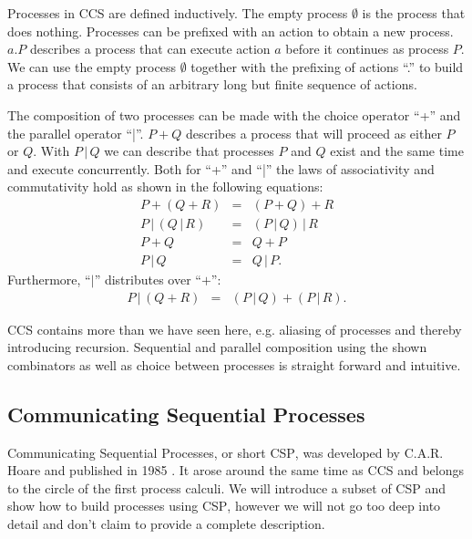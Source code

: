 Processes in \textsc{CCS} are defined inductively. The empty process $\emptyset$ is the process that does nothing. Processes can be prefixed with an action to obtain a new process. $a.P$ describes a process that can execute action $a$ before it continues as process $P$. We can use the empty process $\emptyset$ together with the prefixing of actions \enquote{.} to build a process that consists of an arbitrary long but finite sequence of actions.

The composition of two processes can be made with the choice operator \enquote{+} and the parallel operator \enquote{|}. $P + Q$ describes a process that will proceed as either $P$ or $Q$. With $P \,|\, Q$ we can describe that processes $P$ and $Q$ exist and the same time and execute concurrently. Both for \enquote{+} and \enquote{|} the laws of associativity and commutativity hold as shown in the following equations:
\begin{eqnarray*}
  P + \left( Q + R \right) & = & \left( P + Q \right) + R \\
  P \,|\, \left( Q \,|\, R \right) & = & \left( P \,|\, Q \right) \,|\, R \\
  P + Q & = & Q + P \\
  P \,|\, Q & = & Q \,|\, P.
\end{eqnarray*}
Furthermore, \enquote{$|$} distributes over \enquote{$+$}:
\begin{eqnarray*}
  P \,|\, \left( Q + R \right) & = & \left( P \,|\, Q \right) + \left( P \,|\, R \right).
\end{eqnarray*}

\textsc{CCS} contains more than we have seen here, e.g. aliasing of processes and thereby introducing recursion. Sequential and parallel composition using the shown combinators as well as choice between processes is straight forward and intuitive.

\subsection{Communicating Sequential Processes}
Communicating Sequential Processes, or short \textsc{CSP}, was developed by C.A.R. Hoare and published in 1985 \cite{Hoare:1985:CSP:3921}. It arose around the same time as \textsc{CCS} and belongs to the circle of the first process calculi. We will introduce a subset of \textsc{CSP} and show how to build processes using \textsc{CSP}, however we will not go too deep into detail and don't claim to provide a complete description.

